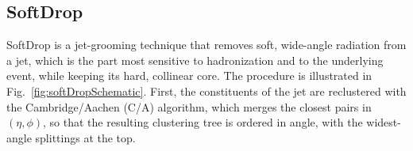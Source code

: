 \subsection{SoftDrop}
\label{sec:softDropDesc}
SoftDrop is a jet-grooming technique that removes soft, wide-angle radiation from a jet, which is the part most sensitive to hadronization and to the underlying event, while keeping its hard, collinear core.
%
The procedure is illustrated in Fig.~\ref{fig:softDropSchematic}.
%
First, the constituents of the jet are reclustered with the Cambridge/Aachen (C/A) algorithm, which merges the closest pairs in \((\eta, \phi)\), so that the resulting clustering tree is ordered in angle, with the widest-angle splittings at the top.
\begin{figure}
	\centering
	\usetikzlibrary{arrows.meta, calc}
\end{figure}

